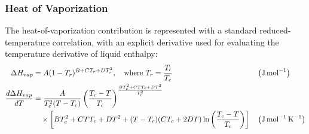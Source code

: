             \subsubsection{Heat of Vaporization}
                The heat-of-vaporization contribution is represented with a standard reduced-temperature correlation, with an explicit derivative used for evaluating the temperature derivative of liquid enthalpy:
                \begin{align}
                    \Delta H_{vap} &= A (1 - T_r)^{B + C T_r + D T_r^2}, \quad \text{where } T_r = \frac{T_l}{T_c}
                    && \left(\unit{J\,mol^{-1}}\right)\\
                    \frac{d\Delta H_{vap}}{dT}
                    &= \frac{A}{T_c^2(T - T_c)}
                    \left( \frac{T_c - T}{T_c} \right)^{\frac{BT_c^2 + CTT_c + DT^2}{T_c^2}} \notag\\
                    &\quad\times \left[ BT_c^2 + CTT_c + DT^2
                    + (T - T_c)(CT_c + 2DT) \ln\left( \frac{T_c - T}{T_c} \right) \right]
                    && \left(\unit{J\,mol^{-1}\,K^{-1}}\right)
                \end{align}

